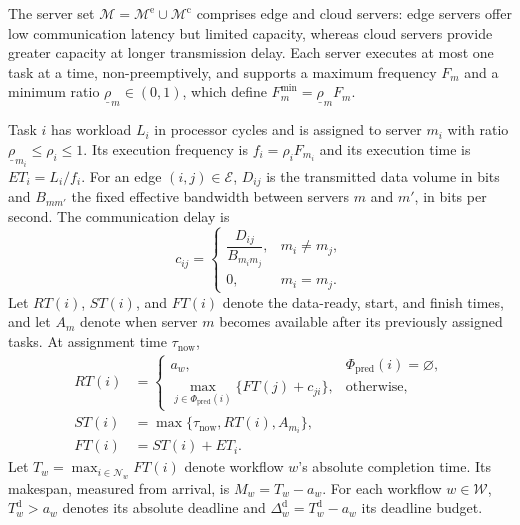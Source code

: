 \documentclass[journal]{IEEEtran}
\begin{document}
The server set $\mathcal M=\mathcal M^{\mathrm e}\cup \mathcal M^{\mathrm c}$ comprises edge and cloud servers: edge servers offer low communication latency but limited capacity, whereas cloud servers provide greater capacity at longer transmission delay. Each server executes at most one task at a time, non-preemptively, and supports a maximum frequency $F_m$ and a minimum ratio $\underline\rho_m\in(0,1)$, which define $F_m^{\min}=\underline\rho_m F_m$.

Task $i$ has workload $L_i$ in processor cycles and is assigned to server $m_i$ with ratio $\underline\rho_{m_i}\leq\rho_i\leq1$. Its execution frequency is $f_i=\rho_iF_{m_i}$ and its execution time is $ET_i=L_i/f_i$. For an edge $(i,j)\in\mathcal E$, $D_{ij}$ is the transmitted data volume in bits and $B_{mm'}$ the fixed effective bandwidth between servers $m$ and $m'$, in bits per second. The communication delay is
\begin{equation*}
    c_{ij}=
    \begin{cases}
        \dfrac{D_{ij}}{B_{m_i m_j}}, & m_i\neq m_j,\\[2mm]
        0, & m_i=m_j.
    \end{cases}
\end{equation*}
Let $RT(i)$, $ST(i)$, and $FT(i)$ denote the data-ready, start, and finish times, and let $A_m$ denote when server $m$ becomes available after its previously assigned tasks. At assignment time $\tau_{\mathrm{now}}$,
\begin{align}
    RT(i)&=
    \begin{cases}
        a_w, & \Phi_{\mathrm{pred}}(i)=\varnothing,\\[2mm]
        \displaystyle
        \max_{j\in\Phi_{\mathrm{pred}}(i)}
        \{FT(j)+c_{ji}\}, & \text{otherwise},
    \end{cases}
    \label{eq:ready_time}\\
    ST(i)&=\max\{\tau_{\mathrm{now}},RT(i),A_{m_i}\},
        \label{eq:start_time}\\
    FT(i)&=ST(i)+ET_i. \label{eq:finish_time}
\end{align}
Let $T_w=\max_{i\in\mathcal N_w}FT(i)$ denote workflow $w$'s absolute completion time. Its makespan, measured from arrival, is $M_w=T_w-a_w$. For each workflow $w\in\mathcal W$, $T_w^{\mathrm d}>a_w$ denotes its absolute deadline and $\Delta_w^{\mathrm d}=T_w^{\mathrm d}-a_w$ its deadline budget.
\end{document}
